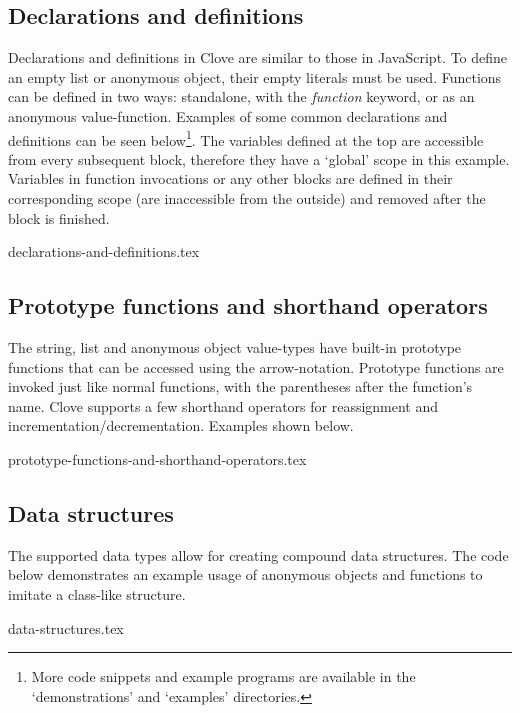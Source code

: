 \documentclass[12pt,a4paper]{article}
\begin{document}
\subsection*{Declarations and definitions}
Declarations and definitions in Clove are similar to those in JavaScript. To define an empty list or anonymous object, their empty literals must be used. Functions can be defined in two ways: standalone, with the \emph{function} keyword, or as an anonymous value-function. Examples of some common declarations and definitions can be seen below\footnote{More code snippets and example programs are available in the `demonstrations' and `examples' directories.}. The variables defined at the top are accessible from every subsequent block, therefore they have a `global' scope in this example. Variables in function invocations or any other blocks are defined in their corresponding scope (are inaccessible from the outside) and removed after the block is finished.

{declarations-and-definitions.tex}



\subsection*{Prototype functions and shorthand operators}
The string, list and anonymous object value-types have built-in prototype functions that can be accessed using the arrow-notation. Prototype functions are invoked just like normal functions, with the parentheses after the function's name. Clove supports a few shorthand operators for reassignment and incrementation/decrementation. Examples shown below.

{prototype-functions-and-shorthand-operators.tex}



\vspace{-1.5em}
\subsection*{Data structures}
The supported data types allow for creating compound data structures. The code below demonstrates an example usage of anonymous objects and functions to imitate a class-like structure.

{data-structures.tex}



\vspace{-1.5em}
\end{document}
